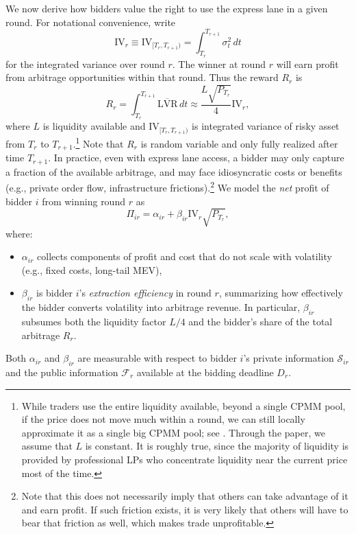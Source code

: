 \documentclass[runningheads]{llncs}
\newcommand{\IV}{\mathrm{IV}}
\begin{document}
We now derive how bidders value the right to use the express lane in a given
round. For notational convenience, write
\[
  \IV_r \equiv \IV_{[T_r, T_{r+1})}
  = \int_{T_r}^{T_{r+1}} \sigma_t^2 \, dt
\]
for the integrated variance over round $r$. The winner at round \(r\) will earn profit from arbitrage opportunities within that round. Thus the reward \(R_r\) is \[
R_r = \int^{T_{r+1}}_{T_r} \overline{\mathrm{LVR}} \, dt \approx \frac{L\sqrt{P_{T_r}}}{4} \IV_r,
\] where \(L\) is liquidity available and \(\IV_{[T_r, T_{r+1})}\) is integrated variance of risky asset from \(T_r\) to \(T_{r + 1}\).\footnote{While traders use the entire liquidity available, beyond a single CPMM pool, if the price does not move much within a round, we can still locally approximate it as a single big CPMM pool; see \cite{Dan2021UniswapV3Universal}. Through the paper, we assume that \(L\) is constant. It is roughly true, since the majority of liquidity is provided by professional LPs who concentrate liquidity near the current price most of the time.} Note that \(R_r\) is random variable and only fully realized after time \(T_{r+1}\). In practice, even with express lane access, a bidder may only capture a fraction of the available arbitrage, and may face idiosyncratic costs or benefits (e.g., private order flow, infrastructure frictions).\footnote{Note that this does not necessarily imply that others can take advantage of it and earn profit. If such friction exists, it is very likely that others will have to bear that friction as well, which makes trade unprofitable.} We model the \emph{net} profit of bidder $i$ from winning round $r$ as
\begin{equation}\label{eq:profit-def}
  \Pi_{ir}
  = \alpha_{ir} + \beta_{ir} \IV_r \sqrt{P_{T_r}},
\end{equation}
where:
\begin{itemize}
  \item $\alpha_{ir}$ collects components of profit and cost that do not scale with volatility (e.g., fixed costs, long-tail MEV),
  \item $\beta_{ir}$ is bidder $i$'s \emph{extraction efficiency} in round $r$, summarizing how effectively the bidder converts volatility into arbitrage revenue. In particular, $\beta_{ir}$ subsumes both the liquidity factor $L/4$ and the bidder's share of the total arbitrage $R_r$.
\end{itemize}
Both $\alpha_{ir}$ and $\beta_{ir}$ are measurable with respect to bidder $i$'s private information $\mathcal S_{ir}$ and the public information $\mathcal F_r$ available at the bidding deadline $D_r$.
\end{document}
